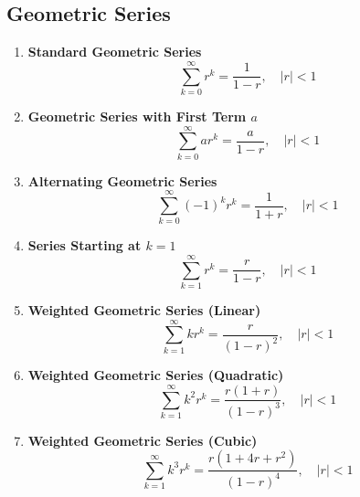 \documentclass[twoside]{article}
\begin{document}
\begin{multicols*}{2}
{
\subsection*{Geometric Series}
}
\begin{enumerate}[leftmargin=*]
    \item \textbf{Standard Geometric Series}
        \[\sum_{k=0}^{\infty} r^k = \frac{1}{1 - r}, \quad |r| < 1\]
    
    \item \textbf{Geometric Series with First Term $a$}
        \[\sum_{k=0}^{\infty} a r^k = \frac{a}{1 - r}, \quad |r| < 1\]
    
    \item \textbf{Alternating Geometric Series}
        \[\sum_{k=0}^{\infty} (-1)^k r^k = \frac{1}{1 + r}, \quad |r| < 1\]
    
    \item \textbf{Series Starting at $k=1$}
        \[\sum_{k=1}^{\infty} r^k = \frac{r}{1 - r}, \quad |r| < 1\]
    
    \item \textbf{Weighted Geometric Series (Linear)}
        \[\sum_{k=1}^{\infty} k r^k = \frac{r}{(1 - r)^2}, \quad |r| < 1\]
    
    \item \textbf{Weighted Geometric Series (Quadratic)}
        \[\sum_{k=1}^{\infty} k^2 r^k = \frac{r(1 + r)}{(1 - r)^3}, \quad |r| < 1\]
    
    \item \textbf{Weighted Geometric Series (Cubic)}
        \[\sum_{k=1}^{\infty} k^3 r^k = \frac{r(1 + 4r + r^2)}{(1 - r)^4}, \quad |r| < 1\]
\end{enumerate}

\end{multicols*}
\end{document}
